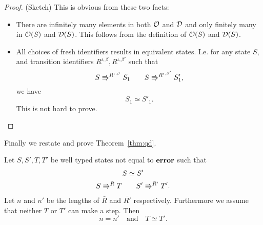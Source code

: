 \begin{proof}{(Sketch)}
  This is obvious from these two facts:
  \begin{itemize}
    \item There are infinitely many elements in both $\mathcal{O}$ and $\mathcal{D}$ and
      only finitely many in $\mathcal{O}(S)$ and $\mathcal{D}(S)$. This follows from
      the definition of $\mathcal{O}(S)$ and $\mathcal{D}(S)$.
    \item All choices of fresh identifiers results in equivalent states. I.e.
      for any state $S$, and transition identifiers $R^{\iota, \beta},
      R^{\iota, \beta'}$ such that 
      \begin{equation*}
        S \Rrightarrow^{R^{\iota, \beta}} S_1 \quad\quad S
        \Rrightarrow^{R^{\iota, \beta'}} S'_1,
      \end{equation*}
      we have
      \begin{equation*}
        S_1 \simeq S'_1.
      \end{equation*}
      This is not hard to prove.
  \end{itemize}
\end{proof}

Finally we restate and prove Theorem~\ref{thm:qd}.
\begin{theorem*}
  Let $S, S', T, T'$ be well typed states not equal to $\mbox{{\bf error}}$ such that
  \begin{equation*}
    \begin{gathered}
      S \simeq S' \\
      S \Rrightarrow^{\bar{R}} T \quad\quad S' \Rrightarrow^{\bar{R'}} T'.
    \end{gathered}
  \end{equation*}
  Let $n$ and $n'$ be the lengths of $\bar{R}$ and $\bar{R'}$ respectively.
  Furthermore we assume that neither $T$ or $T'$ can make a step.  Then
  \begin{equation*}
    n = n' \quad \text{and} \quad T \simeq T'.
  \end{equation*}
\end{theorem*}


